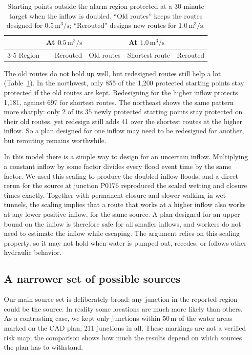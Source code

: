 \documentclass[11pt,a4paper]{article}
\begin{document}
\begin{table}[htbp]
\centering\small
\caption{Starting points outside the alarm region protected at a 30-minute target when the inflow is doubled. ``Old routes'' keeps the routes designed for $0.5\,\mathrm{m^3/s}$; ``Rerouted'' designs new routes for $1.0\,\mathrm{m^3/s}$.}\label{tab:flow}
\begin{tabular}{@{}lrrrr@{}}\toprule
& At $0.5\,\mathrm{m^3/s}$ & \multicolumn{3}{c}{At $1.0\,\mathrm{m^3/s}$}\\
\cmidrule(lr){3-5}
Region & Rerouted & Old routes & Shortest route & Rerouted\\\midrule

\end{tabular}
\end{table}

The old routes do not hold up well, but redesigned routes still help a lot (Table~\ref{tab:flow}). In the northwest, only 855 of the 1,200 protected starting points stay protected if the old routes are kept. Redesigning for the higher inflow protects 1,181, against 697 for shortest routes. The northeast shows the same pattern more sharply: only 2 of its 35 newly protected starting points stay protected on their old routes, yet redesign still adds 41 over the shortest routes at the higher inflow. So a plan designed for one inflow may need to be redesigned for another, but rerouting remains worthwhile.

In this model there is a simple way to design for an uncertain inflow. Multiplying a constant inflow by some factor divides every flood event time by the same factor. We used this scaling to produce the doubled-inflow floods, and a direct rerun for the source at junction P0176 reproduced the scaled wetting and closure times exactly. Together with permanent closure and slower walking in wet tunnels, the scaling implies that a route that works at a higher inflow also works at any lower positive inflow, for the same source. A plan designed for an upper bound on the inflow is therefore safe for all smaller inflows, and workers do not need to estimate the inflow while escaping. The argument relies on this scaling property, so it may not hold when water is pumped out, recedes, or follows other hydraulic behavior.

\subsection{A narrower set of possible sources}
Our main source set is deliberately broad: any junction in the reported region could be the source. In reality some locations are much more likely than others. As a contrasting case, we kept only junctions within 50\,m of the water areas marked on the CAD plan, 211 junctions in all. These markings are not a verified risk map; the comparison shows how much the results depend on which sources the plan has to withstand.
\end{document}
